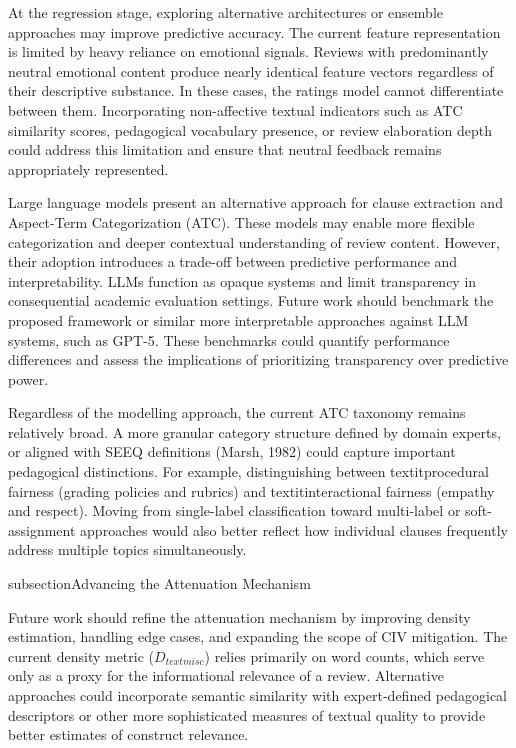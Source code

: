 At the regression stage, exploring alternative architectures or ensemble approaches may improve predictive accuracy. The current feature representation is limited by heavy reliance on emotional signals. Reviews with predominantly neutral emotional content produce nearly identical feature vectors regardless of their descriptive substance. In these cases, the ratings model cannot differentiate between them. Incorporating non-affective textual indicators such as ATC similarity scores, pedagogical vocabulary presence, or review elaboration depth could address this limitation and ensure that neutral feedback remains appropriately represented.

Large language models present an alternative approach for clause extraction and Aspect-Term Categorization (ATC). These models may enable more flexible categorization and deeper contextual understanding of review content. However, their adoption introduces a trade-off between predictive performance and interpretability. LLMs function as opaque systems and limit transparency in consequential academic evaluation settings. Future work should benchmark the proposed framework or similar more interpretable approaches against LLM systems, such as GPT-5. These benchmarks could quantify performance differences and assess the implications of prioritizing transparency over predictive power.

Regardless of the modelling approach, the current ATC taxonomy remains relatively broad. A more granular category structure defined by domain experts, or aligned with SEEQ definitions (Marsh, 1982) could capture important pedagogical distinctions. For example, distinguishing between textit{procedural fairness} (grading policies and rubrics) and textit{interactional fairness} (empathy and respect). Moving from single-label classification toward multi-label or soft-assignment approaches would also better reflect how individual clauses frequently address multiple topics simultaneously.

subsection{Advancing the Attenuation Mechanism}

Future work should refine the attenuation mechanism by improving density estimation, handling edge cases, and expanding the scope of CIV mitigation. The current density metric ($D_{text{misc}}$) relies primarily on word counts, which serve only as a proxy for the informational relevance of a review. Alternative approaches could incorporate semantic similarity with expert-defined pedagogical descriptors or other more sophisticated measures of textual quality to provide better estimates of construct relevance.


